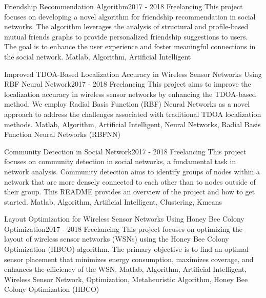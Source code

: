 
\begin{projects}
	\project
	{Friendship Recommendation Algorithm}{2017 - 2018}
	{ {Freelancing} }
	{This project focuses on developing a novel algorithm for friendship recommendation in social networks. The algorithm leverages the analysis of structural and profile-based mutual friends graphs to provide personalized friendship suggestions to users. The goal is to enhance the user experience and foster meaningful connections in the social network.}
	{Matlab, Algorithm, Artificial Intelligent}
				
	\project
	{Improved TDOA-Based Localization Accuracy in Wireless Sensor Networks Using RBF Neural Network}{2017 - 2018}
	{ {Freelancing} }
	{This project aims to improve the localization accuracy in wireless sensor networks by enhancing the TDOA-based method. We employ Radial Basis Function (RBF) Neural Networks as a novel approach to address the challenges associated with traditional TDOA localization methods.}
	{Matlab, Algorithm, Artificial Intelligent, Neural Networks, Radial Basis Function Neural Networks (RBFNN)}

	\project
	{Community Detection in Social Network}{2017 - 2018}
	{ {Freelancing} }
	{This project focuses on community detection in social networks, a fundamental task in network analysis. Community detection aims to identify groups of nodes within a network that are more densely connected to each other than to nodes outside of their group. This README provides an overview of the project and how to get started.}
	{Matlab, Algorithm, Artificial Intelligent, Clustering, Kmeans}

	\project
	{Layout Optimization for Wireless Sensor Networks Using Honey Bee Colony Optimization}{2017 - 2018}
	{ {Freelancing} }
	{This project focuses on optimizing the layout of wireless sensor networks (WSNs) using the Honey Bee Colony Optimization (HBCO) algorithm. The primary objective is to find an optimal sensor placement that minimizes energy consumption, maximizes coverage, and enhances the efficiency of the WSN.}
	{Matlab, Algorithm, Artificial Intelligent, Wireless Sensor Network, Optimization, Metaheuristic Algorithm, Honey Bee Colony Optimization (HBCO)}


\end{projects}
